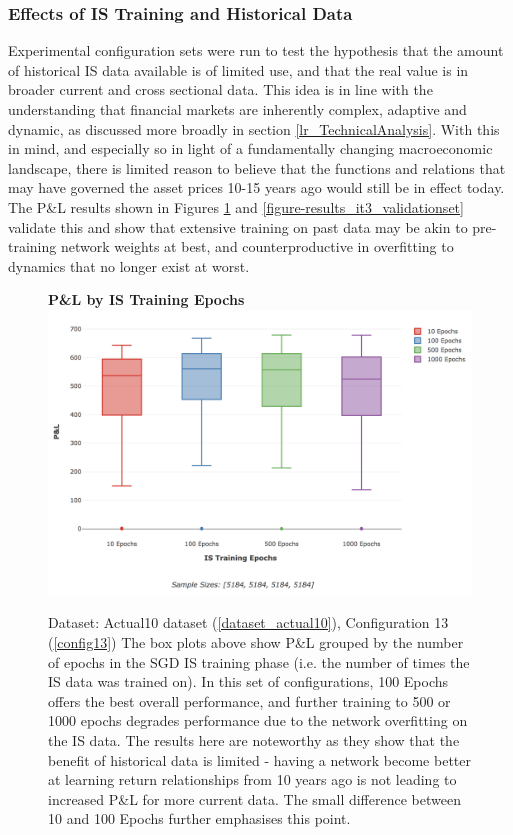 \documentclass[a4paper,11pt,oneside]{article}
\theoremstyle{plain}
\theoremstyle{definition}
\begin{document}
	
	\subsubsection{Effects of IS Training and Historical Data}\label{results_data_hist}
	
	Experimental configuration sets were run to test the hypothesis that the amount of historical IS data available is of limited use, and that the real value is in broader current and cross sectional data. This idea is in line with the understanding that financial markets are inherently complex, adaptive and dynamic, as discussed more broadly in section \ref{lr_TechnicalAnalysis}. With this in mind, and especially so in light of a fundamentally changing macroeconomic landscape, there is limited reason to believe that the functions and relations that may have governed the asset prices 10-15 years ago would still be in effect today. The P\&L results shown in Figures \ref{figure-results_pl_max_epochs} and \ref{figure-results_it3_validationset} validate this and show that extensive training on past data may be akin to pre-training network weights at best, and counterproductive in overfitting to dynamics that no longer exist at worst.
	
	
	
	\begin{figure}[H]
		\centering 
		\textbf{P\&L by IS Training Epochs}
		\includegraphics[scale=0.4]{images/results/data/max_epochs.png}
		\caption[P\&L by IS Training Epochs]{
			Dataset: Actual10 dataset (\ref{dataset_actual10}), Configuration 13 (\ref{config13}) 
			\newline The box plots above show P\&L grouped by the number of epochs in the SGD IS training phase (i.e. the number of times the IS data was trained on). In this set of configurations, 100 Epochs offers the best overall performance, and further training to 500 or 1000 epochs degrades performance due to the network overfitting on the IS data. The results here are noteworthy as they show that the benefit of historical data is limited - having a network become better at learning return relationships from 10 years ago is not leading to increased P\&L for more current data. The small difference between 10 and 100 Epochs further emphasises this point.
		}
		\label{figure-results_pl_max_epochs}
	\end{figure}
	
\end{document}

